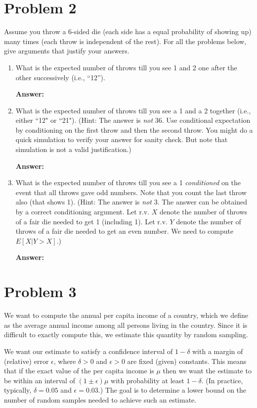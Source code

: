 \documentclass[11pt]{article}
\begin{document}
\section*{Problem 2} 
Assume you throw a  6-sided die (each side has a equal probability of showing up) many times (each throw is independent of the rest).
For all the problems below, give arguments that justify your answers.
\begin{enumerate}
\item What is the expected number of throws
till you see 1 and 2 one after the other successively (i.e., ``12'').  

    \textbf{Answer:}
    
\item What is the expected number of throws till you see a 1 and a 2 together (i.e., either ``12" or ``21").  (Hint: The answer is {\em not} 36.  Use conditional expectation by conditioning on the first throw and then the second throw. You might do a quick simulation to verify your answer for sanity check. But note that simulation is not a valid justification.)

    \textbf{Answer:}
    
\item What is the expected number of throws till you see a 1  {\em conditioned} on the event that all throws gave odd numbers.
Note that you count the last throw also (that shows 1). (Hint: The answer is {\em not} 3. The answer can be obtained by a correct conditioning argument. Let r.v. $X$ denote the number of throws of a fair die needed to  get 1 (including 1).
 Let r.v. $Y$ denote the number of throws of a fair die needed to get an even number.
We need to compute  $E[X|Y > X]$.)

    \textbf{Answer:}
    
\end{enumerate}


\section*{Problem 3}

We want to compute the annual per capita income of a country, which we define as the average annual income among
all persons living in the country. Since it is difficult to exactly compute this, we estimate this quantity by random sampling.

We want our estimate to satisfy a confidence interval of $1-\delta$ with a margin of (relative) error $\epsilon$,
where $\delta > 0$ and $\epsilon > 0$ are fixed (given) constants. This means that if the exact value of the per capita
income is $\mu$ then we want the estimate to be within an interval of $(1\pm\epsilon)\mu$  with probability at least $1-\delta$.
 (In practice, typically, $\delta = 0.05$ and $\epsilon = 0.03$.)
The goal is to determine a lower bound on the
number of random samples needed to achieve such an estimate.
\end{document}
